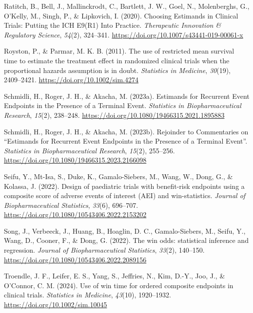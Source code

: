 \documentclass[
  letterpaper,
  DIV=11,
  numbers=noendperiod]{scrreprt}
\newlength{\cslhangindent}
\newlength{\cslentryspacingunit} %
\newenvironment{CSLReferences}[2] %
 {%
  \setlength{\parindent}{0pt}
  \ifodd #1
  \let\oldpar\par
  \def\par{\hangindent=\cslhangindent\oldpar}
  \fi
  \setlength{\parskip}{#2\cslentryspacingunit}
 }%
 {}
\begin{document}
\begin{CSLReferences}{1}{0}
\leavevmode{}%
Ratitch, B., Bell, J., Mallinckrodt, C., Bartlett, J. W., Goel, N.,
Molenberghs, G., O'Kelly, M., Singh, P., \& Lipkovich, I. (2020).
Choosing Estimands in Clinical Trials: Putting the ICH E9(R1) Into
Practice. \emph{Therapeutic Innovation \& Regulatory Science},
\emph{54}(2), 324--341. \url{https://doi.org/10.1007/s43441-019-00061-x}

\leavevmode{}%
Royston, P., \& Parmar, M. K. B. (2011). The use of restricted mean
survival time to estimate the treatment effect in randomized clinical
trials when the proportional hazards assumption is in doubt.
\emph{Statistics in Medicine}, \emph{30}(19), 2409--2421.
\url{https://doi.org/10.1002/sim.4274}

\leavevmode{}%
Schmidli, H., Roger, J. H., \& Akacha, M. (2023a). Estimands for
Recurrent Event Endpoints in the Presence of a Terminal Event.
\emph{Statistics in Biopharmaceutical Research}, \emph{15}(2), 238--248.
\url{https://doi.org/10.1080/19466315.2021.1895883}

\leavevmode{}%
Schmidli, H., Roger, J. H., \& Akacha, M. (2023b). Rejoinder to
Commentaries on {``}Estimands for Recurrent Event Endpoints in the
Presence of a Terminal Event{''}. \emph{Statistics in Biopharmaceutical
Research}, \emph{15}(2), 255--256.
\url{https://doi.org/10.1080/19466315.2023.2166098}

\leavevmode{}%
Seifu, Y., Mt-Isa, S., Duke, K., Gamalo-Siebers, M., Wang, W., Dong, G.,
\& Kolassa, J. (2022). Design of paediatric trials with benefit-risk
endpoints using a composite score of adverse events of interest (AEI)
and win-statistics. \emph{Journal of Biopharmaceutical Statistics},
\emph{33}(6), 696--707.
\url{https://doi.org/10.1080/10543406.2022.2153202}

\leavevmode{}%
Song, J., Verbeeck, J., Huang, B., Hoaglin, D. C., Gamalo-Siebers, M.,
Seifu, Y., Wang, D., Cooner, F., \& Dong, G. (2022). The win odds:
statistical inference and regression. \emph{Journal of Biopharmaceutical
Statistics}, \emph{33}(2), 140--150.
\url{https://doi.org/10.1080/10543406.2022.2089156}

\leavevmode{}%
Troendle, J. F., Leifer, E. S., Yang, S., Jeffries, N., Kim, D.-Y., Joo,
J., \& O'Connor, C. M. (2024). Use of win time for ordered composite
endpoints in clinical trials. \emph{Statistics in Medicine},
\emph{43}(10), 1920--1932. \url{https://doi.org/10.1002/sim.10045}


\end{CSLReferences}
\end{document}
